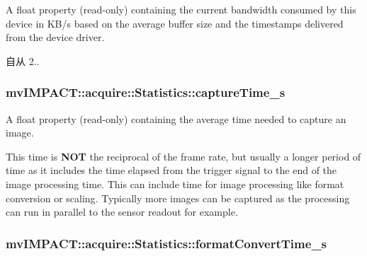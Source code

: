A float property {\bfseries }(read-\/only) containing the current bandwidth consumed by this device in K\+B/s based on the average buffer size and the timestamps delivered from the device driver. 

\begin{DoxySince}{自从}
2.. 
\end{DoxySince}
\hypertarget{classmv_i_m_p_a_c_t_1_1acquire_1_1_statistics_a0f67a746f45715fcb71fc36dfe0bd286}{
\subsubsection[{capture\+Time\+\_\+s}]{ mv\+I\+M\+P\+A\+C\+T\+::acquire\+::\+Statistics\+::capture\+Time\+\_\+s}}\label{classmv_i_m_p_a_c_t_1_1acquire_1_1_statistics_a0f67a746f45715fcb71fc36dfe0bd286}


A float property {\bfseries }(read-\/only) containing the average time needed to capture an image. 

This time is {\bfseries N\+O\+T} the reciprocal of the frame rate, but usually a longer period of time as it includes the time elapsed from the trigger signal to the end of the image processing time. This can include time for image processing like format conversion or scaling. Typically more images can be captured as the processing can run in parallel to the sensor readout for example. \hypertarget{classmv_i_m_p_a_c_t_1_1acquire_1_1_statistics_a27471ea82829cdb1540804d89dad5f57}{
\subsubsection[{format\+Convert\+Time\+\_\+s}]{ mv\+I\+M\+P\+A\+C\+T\+::acquire\+::\+Statistics\+::format\+Convert\+Time\+\_\+s}}\label{classmv_i_m_p_a_c_t_1_1acquire_1_1_statistics_a27471ea82829cdb1540804d89dad5f57}


